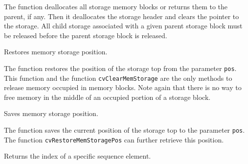 
\begin{description}
\end{description}

The function deallocates all storage memory
blocks or returns them to the parent, if any. Then it deallocates the
storage header and clears the pointer to the storage. All child storage 
associated with a given parent storage block must be released before the 
parent storage block is released.

Restores memory storage position.


\begin{description}
\end{description}

The function restores the position of the storage top from the parameter \texttt{pos}. This function and the function \texttt{cvClearMemStorage} are the only methods to release memory occupied in memory blocks. Note again that there is no way to free memory in the middle of an occupied portion of a storage block.


Saves memory storage position.


\begin{description}
\end{description}

The function saves the current position
of the storage top to the parameter \texttt{pos}. The function
\texttt{cvRestoreMemStoragePos} can further retrieve this position.

Returns the index of a specific sequence element.


